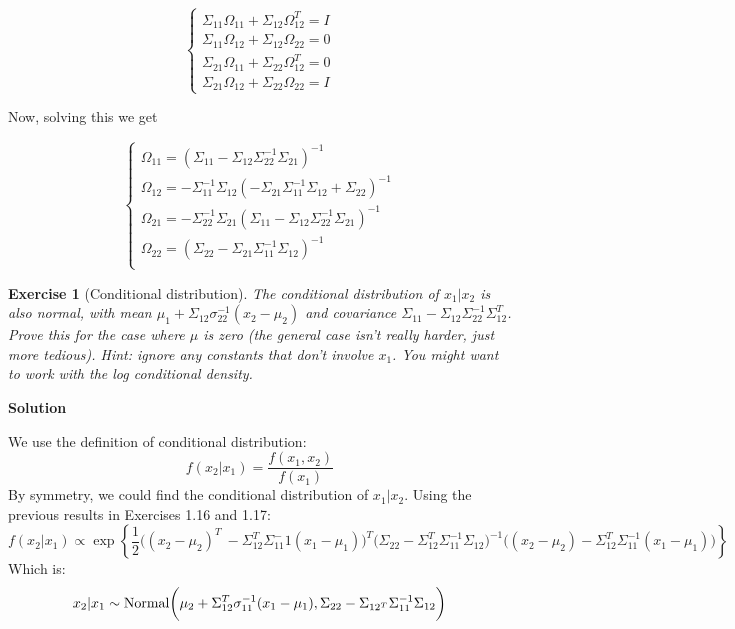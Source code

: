 \documentclass[twoside]{article}
\newcounter{lecnum}
\newtheorem{exercise}{Exercise}[lecnum]
\begin{document}
\[
\left\{ 
\begin{array}{c}
\Sigma_{11}\Omega_{11} + \Sigma_{12}\Omega_{12} ^T = I \\ 
\Sigma_{11}\Omega_{12} + \Sigma_{12}\Omega_{22} = 0 \\ 
\Sigma_{21}\Omega_{11} + \Sigma_{22}\Omega_{12} ^T= 0 \\
\Sigma_{21}\Omega_{12} + \Sigma_{22}\Omega_{22}= I
\end{array}
\right. 
\]

Now, solving this we get


\[
\left\{ 
\begin{array}{c}
\Omega_{11} = (\Sigma_{11} -\Sigma_{12}\Sigma_{22}^{-1} \Sigma_{21} )^{-1} \\ 
\Omega_{12} = -\Sigma_{11}^{-1}\Sigma_{12} (-\Sigma_{21}\Sigma_{11}^{-1} \Sigma_{12} +\Sigma_{22} )^{-1}  \\
\Omega_{21} = - \Sigma_{22}^{-1} \Sigma_{21} (\Sigma_{11}-\Sigma_{12}\Sigma_{22}^{-1} \Sigma_{21})^{-1}  \\
\Omega_{22} = (\Sigma_{22}- \Sigma_{21} \Sigma_{11}^{-1}\Sigma_{12}  )^{-1}  \\ 
\end{array}
\right. 
\]



\color{black}
\vspace{10mm}


\begin{exercise}[Conditional distribution]
  The conditional distribution of $x_1|x_2$ is also normal, with mean $\mu_1+\Sigma_{12}\sigma_{22}^{-1}(x_2-\mu_2)$ and covariance $\Sigma_{11} - \Sigma_{12}\Sigma_{22}^{-1}\Sigma_{12}^T$. Prove this for the case where $\mu$ is zero (the general case isn't really harder, just more tedious). \textit{Hint: ignore any constants that don't involve $x_1$. You might want to work with the log conditional density.}
\end{exercise}
  

\color{blue}
\textbf{Solution}

We use the definition of conditional distribution:
$$ f(x_2 | x_1) =  \frac{f(x_1,x_2)}{  f(x_1) } $$ 
By symmetry, we could find the conditional distribution of $x_1|x_2$. Using the previous results in Exercises 1.16 and 1.17: 
$$ f(x_2 | x_1) \propto \exp\left\{
\frac{1}{2}\bigg((x_2-\mu_2)^T\ - \Sigma_{12}^T\Sigma_{11}^-1(x_1-\mu_1)\bigg)^T 
\bigg(\Sigma_{22}-\Sigma_{12}^T\Sigma_{11}^{-1}\Sigma_{12}\bigg)^{-1}
\bigg((x_2-\mu_2) - \Sigma_{12}^T\Sigma_{11}^{-1} (x_1-\mu_1) \bigg)
\right\} 
$$
Which is:
$$ x_2 | x_1  \stackrel{\small{}}{\sim} \mbox{Normal} \bigg(
\mu_2 + \Sigma_{12}^T\sigma_{11}^{-1}(x_1-\mu_1),
\Sigma_{22} - \Sigma_{12^T}\Sigma_{11}^{-1}\Sigma_{12}
 \bigg) $$
\color{black}
\end{document}
